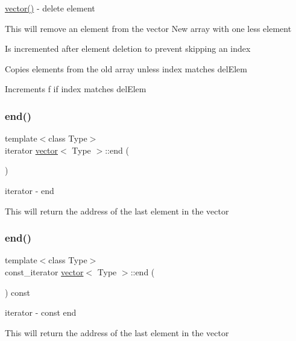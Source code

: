 \hyperlink{classvector_ab8d8ebaa9b91a05bb7a94371cb84c042}{vector()} -\/ delete element 

This will remove an element from the vector New array with one less element

Is incremented after element deletion to prevent skipping an index

Copies elements from the old array unless index matches del\+Elem

Increments f if index matches del\+Elem \hypertarget{classvector_a37658994f03de8e7e2122a24877169f5}{}\label{classvector_a37658994f03de8e7e2122a24877169f5} 
\subsubsection{\texorpdfstring{end()}{end()}\hspace{0.1cm}{\footnotesize\ttfamily [1/2]}}
{\footnotesize\ttfamily template$<$class Type$>$ \\
iterator \hyperlink{classvector}{vector}$<$ Type $>$\+::end (\begin{DoxyParamCaption}{ }\end{DoxyParamCaption})\hspace{0.3cm}{\ttfamily [inline]}}



iterator -\/ end 

This will return the address of the last element in the vector \hypertarget{classvector_ab07ef3f43e79f9e9e5080ccaaab6cfd2}{}\label{classvector_ab07ef3f43e79f9e9e5080ccaaab6cfd2} 
\subsubsection{\texorpdfstring{end()}{end()}\hspace{0.1cm}{\footnotesize\ttfamily [2/2]}}
{\footnotesize\ttfamily template$<$class Type$>$ \\
const\+\_\+iterator \hyperlink{classvector}{vector}$<$ Type $>$\+::end (\begin{DoxyParamCaption}{ }\end{DoxyParamCaption}) const\hspace{0.3cm}{\ttfamily [inline]}}



iterator -\/ const end 

This will return the address of the last element in the vector \hypertarget{classvector_afd19d0871c27f1e2d216749f542cd0ca}{}\label{classvector_afd19d0871c27f1e2d216749f542cd0ca} 

